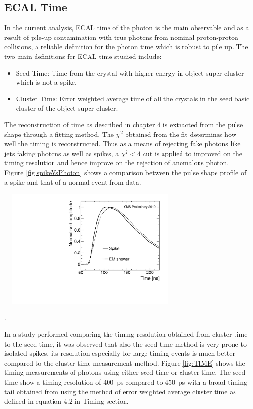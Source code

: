\subsection{ECAL Time}
In the current analysis, ECAL time of the photon is the main observable and as a result of pile-up contamination with true photons from nominal proton-proton collisions, a reliable definition for the photon time which is robust to pile up.
The two main definitions for ECAL time studied include:
\begin{itemize}
\item Seed Time: Time from the crystal with higher energy in object super cluster which is not a spike.
\item Cluster Time: Error weighted average time of all the crystals in the seed basic cluster of the object super cluster.
\end{itemize} 

The reconstruction of time as described in chapter 4 is extracted from the pulse shape through a fitting method. The $\chi^{2}$ obtained from the fit determines how well the timing is reconstructed. Thus as a means of rejecting fake photons like jets faking photons as well as spikes, a $\chi^{2} < 4 $ cut is applied to improved on the timing resolution and hence improve on the rejection of anomalous photon.
Figure \ref{fig:spikeVsPhoton} shows a comparison between the pulse shape profile of a spike and that of a normal event from data.

\begin{center}
\centering
\includegraphics[height=6cm, width=0.7\textwidth]{THESISPLOTS/spike_pulse_shape.pdf}
\label{fig:spikeVsPhoton}
\end{center}.

In a study performed comparing the timing resolution obtained from cluster time to the seed time, it was observed that also the seed time method is very prone to isolated spikes, its resolution especially for large timing events is much better compared to the cluster time measurement method.
Figure \ref{fig:TIME} shows the timing measurements of photons using either seed time or cluster time. The seed time show a timing resolution of $400$~ps compared to $450$~ps with a broad timing tail obtained from using the method of error weighted average cluster time as defined in equation $4.2$ in Timing section.

